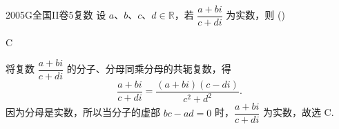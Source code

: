 
\begin{problem}{2005}{G}{全国II卷}{5}{复数}
设 $ a $、$ b $、$ c $、$ d \in \mathbb{R} $，若 $ \dfrac{a+bi}{c+di} $ 为实数，则 (\hspace{1cm})
\begin{choices}
\end{choices}
\end{problem}

\begin{answer}
C
\end{answer}

\begin{solutions}
将复数 $ \dfrac{a+bi}{c+di} $ 的分子、分母同乘分母的共轭复数，得
$$
\dfrac{a+bi}{c+di} = \dfrac{(a+bi)(c-di)}{c^2+d^2}.
$$
因为分母是实数，所以当分子的虚部 $ bc-ad = 0 $ 时，$ \dfrac{a+bi}{c+di} $ 为实数，故选 C.
\end{solutions}